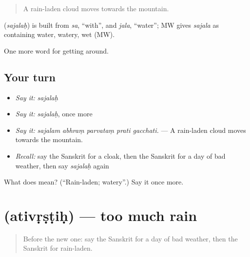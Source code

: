 \begin{quote}
A rain-laden cloud moves towards the mountain.
\end{quote}

\begin{cousinweb}
\textbf{} (\emph{sajalaḥ}) is built from \emph{sa}, \textquotedblleft{}with\textquotedblright{}, and \emph{jala}, \textquotedblleft{}water\textquotedblright{}; MW gives \emph{sajala} as containing water, watery, wet (MW).
\end{cousinweb}

\begin{grammarlens}[title={What you've built}]
One more word for getting around.
\end{grammarlens}

\subsection*{Your turn}
\begin{itemize}
\raggedright
  \item \emph{Say it:} \emph{sajalaḥ}
  \item \emph{Say it:} \emph{sajalaḥ}, once more
  \item \emph{Say it:} \emph{sajalam abhraṃ parvataṃ prati gacchati.} — A rain-laden cloud moves towards the mountain.
  \item \emph{Recall:} say the Sanskrit for a cloak, then the Sanskrit for a day of bad weather, then say \emph{sajalaḥ} again
\end{itemize}

\begin{tcolorbox}[breakable,colback=teal!4,colframe=teal!35!black,title={Before you move on}]
What does  mean? (\textquotedblleft{}Rain-laden; watery\textquotedblright{}.) Say it once more.
\end{tcolorbox}
\section[\texorpdfstring{\sk{अतिवृष्टिः} (ativṛṣṭiḥ)}{अतिवृष्टिः (ativṛṣṭiḥ)}]{ (ativṛṣṭiḥ) — too much rain}

\label{lesson:SA-C441-ativrstih}



\begin{quote}
Before the new one: say the Sanskrit for a day of bad weather, then the Sanskrit for rain-laden.
\end{quote}

